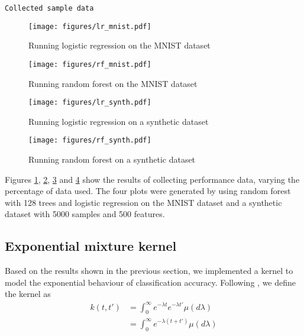 \documentclass[a4paper,12pt,twoside,openright]{report}
\begin{document}
\texttt{Collected sample data}

\begin{figure}
\centering
  \texttt{[image: figures/lr\_mnist.pdf]}
  \caption{Running logistic regression on the MNIST dataset}
  \label{sampledata1}
\end{figure}

\begin{figure}
\centering
  \texttt{[image: figures/rf\_mnist.pdf]}
  \caption{Running random forest on the MNIST dataset}
  \label{sampledata2}
\end{figure}

\begin{figure}
\centering
  \texttt{[image: figures/lr\_synth.pdf]}
  \caption{Running logistic regression on a synthetic dataset}
  \label{sampledata3}
\end{figure}

\begin{figure}
\centering
  \texttt{[image: figures/rf\_synth.pdf]}
  \caption{Running random forest on a synthetic dataset}
  \label{sampledata4}
\end{figure}



Figures \ref{sampledata1}, \ref{sampledata2}, \ref{sampledata3} and \ref{sampledata4} show the results of collecting performance data, varying the percentage of data used. The four plots were generated by using random forest with 128 trees and logistic regression on the MNIST dataset and a synthetic dataset with 5000 samples and 500 features.









\subsection{Exponential mixture kernel}
Based on the results shown in the previous section, we implemented a kernel to model the exponential behaviour of classification accuracy. Following \cite{2014arXiv1406.3896S}, we define the kernel as
\begin{align}
k(t,t') &= \int_{0}^{\infty} e^{-\lambda t}e^{-\lambda t'}\mu(d\lambda)\\
&= \int_{0}^{\infty} e^{-\lambda(t+t')}\mu(d\lambda)
\end{align}
\end{document}
